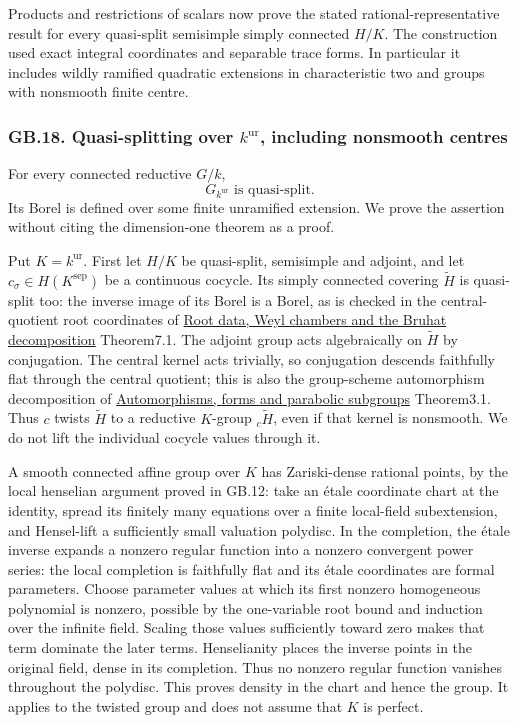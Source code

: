 \documentclass[
  11pt,
]{article}
\begin{document}
Products and restrictions of scalars now prove the stated
rational-representative result for every quasi-split semisimple simply
connected \(H/K\). The construction used exact integral coordinates and
separable trace forms. In particular it includes wildly ramified
quadratic extensions in characteristic two and groups with nonsmooth
finite centre.

\subsubsection{\texorpdfstring{GB.18. Quasi-splitting over
\(k^{\mathrm{ur}}\), including nonsmooth
centres}{GB.18. Quasi-splitting over k\^{}\{\textbackslash mathrm\{ur\}\}, including nonsmooth centres}}\label{gb.18.-quasi-splitting-over-kmathrmur-including-nonsmooth-centres}

For every connected reductive \(G/k\), \[
                 G_{k^{\mathrm{ur}}}\text{ is quasi-split}.    \tag{GB18.1}
\] Its Borel is defined over some finite unramified extension. We prove
the assertion without citing the dimension-one theorem as a proof.

Put \(K=k^{\mathrm{ur}}\). First let \(H/K\) be quasi-split, semisimple
and adjoint, and let \(c_\sigma\in H(K^{\mathrm{sep}})\) be a continuous
cocycle. Its simply connected covering \(\widetilde H\) is quasi-split
too: the inverse image of its Borel is a Borel, as is checked in the
central-quotient root coordinates of \href{../AG-RG/AG-RG-04.html}{Root
data, Weyl chambers and the Bruhat decomposition} Theorem7.1. The
adjoint group acts algebraically on \(\widetilde H\) by conjugation. The
central kernel acts trivially, so conjugation descends faithfully flat
through the central quotient; this is also the group-scheme automorphism
decomposition of \href{../AG-RG/AG-RG-06.html}{Automorphisms, forms and
parabolic subgroups} Theorem3.1. Thus \(c\) twists \(\widetilde H\) to a
reductive \(K\)-group \({}_c\widetilde H\), even if that kernel is
nonsmooth. We do not lift the individual cocycle values through it.

A smooth connected affine group over \(K\) has Zariski-dense rational
points, by the local henselian argument proved in GB.12: take an étale
coordinate chart at the identity, spread its finitely many equations
over a finite local-field subextension, and Hensel-lift a sufficiently
small valuation polydisc. In the completion, the étale inverse expands a
nonzero regular function into a nonzero convergent power series: the
local completion is faithfully flat and its étale coordinates are formal
parameters. Choose parameter values at which its first nonzero
homogeneous polynomial is nonzero, possible by the one-variable root
bound and induction over the infinite field. Scaling those values
sufficiently toward zero makes that term dominate the later terms.
Henselianity places the inverse points in the original field, dense in
its completion. Thus no nonzero regular function vanishes throughout the
polydisc. This proves density in the chart and hence the group. It
applies to the twisted group and does not assume that \(K\) is perfect.
\end{document}
